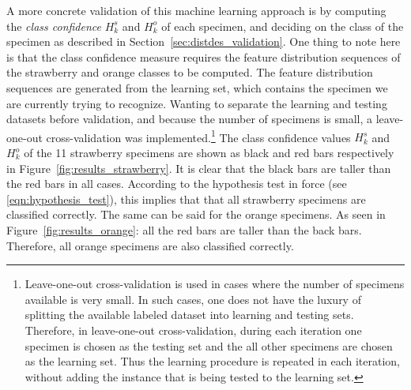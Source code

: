 A more concrete validation of this machine learning approach is by computing the \emph{class confidence} $H^s_k$ and $H^o_k$ of each specimen, and deciding on the class of the specimen as described in Section~\ref{sec:distdes_validation}. One thing to note here is that the class confidence measure requires the feature distribution sequences of the strawberry and orange classes to be computed. The feature distribution sequences are generated from the learning set, which contains the specimen we are currently trying to recognize. Wanting to separate the learning and testing datasets before validation, and because the number of specimens is small, a leave-one-out cross-validation \cite{alpaydin} was implemented.\footnote{Leave-one-out cross-validation is used in cases where the number of specimens available is very small. In such cases, one does not have the luxury of splitting the available labeled dataset into 
learning and testing sets. Therefore, in leave-one-out cross-validation, during each iteration one 
specimen is chosen as the testing set and the all other specimens are chosen as the learning set. Thus the learning procedure is repeated in each iteration, without adding the instance that is being tested to the learning set.} The class confidence values $H^s_k$ and $H^o_k$ of the 11 strawberry specimens are shown as black and red bars respectively in Figure~\ref{fig:results_strawberry}. It is clear that the black bars are taller than the red bars in all cases. According to the hypothesis test in force (see \eqref{eqn:hypothesis_test}), this implies that that all strawberry specimens are classified correctly. The same can be said for the orange specimens. As seen in Figure~\ref{fig:results_orange}: all the red bars are taller than the back bars. Therefore, all orange specimens are also classified correctly.

